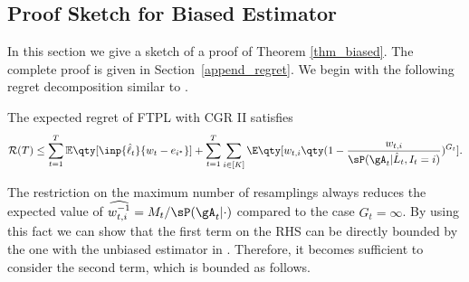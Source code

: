 



\subsection{Proof Sketch for Biased Estimator}
In this section we give a sketch of a proof of Theorem \ref{thm_biased}.
The complete proof is given in Section~\ref{append_regret}.
We begin with the following regret decomposition
similar to \citet[Lemma 5]{JMLR:v17:15-091}.
\begin{lemma}\label{lem: regret decomposition}
The expected regret of FTPL with CGR II satisfies
    \begin{equation*}
        \mathcal{R}(T) \leq \sum_{t=1}^T \mathbb{E}\qty[\inp{\hat{\ell}_t}{w_t - e_{i^*}}] 
        + \sum_{t=1}^T \sum_{i\in [K]} \E\qty[w_{t,i} \qty(1-\frac{w_{t,i}}{\sP(\gA_{t}|\hat{L}_t, I_t=i)})^{G_t}].
    \end{equation*}
\end{lemma}
The restriction on the maximum number of resamplings always reduces the expected value of $\widehat{w_{t,i}^{-1}}=M_t/\sP(\gA_{t}|\cdot)$ compared to the case $G_t=\infty$.
By using this fact we can show that the first term on the RHS can be directly bounded by the one
with the unbiased estimator
in \citet{pmlr-v201-honda23a}.
Therefore, it becomes sufficient to consider the second term, which is bounded as follows.

